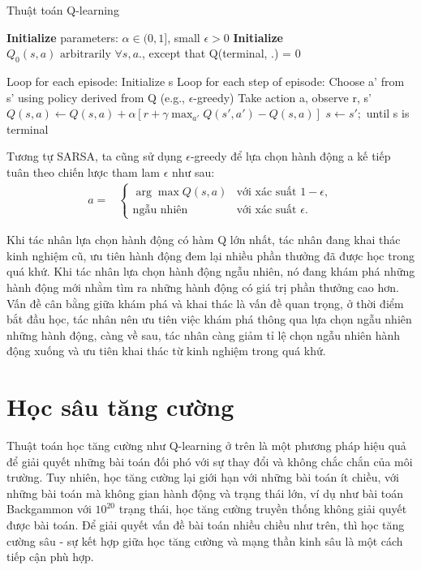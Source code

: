\documentclass{uetgraduation}
\begin{document}
\begin{algorithm}
    \caption{Thuật toán Q-learning}\label{alg:q_learning}
    \begin{algorithmic}[1]
    \State \textbf{Initialize } parameters: $\alpha \in (0, 1]$, small $\epsilon > 0$
    \State \textbf{Initialize } $Q_0(s,a) \text{ arbitrarily } \forall s,a.$, except that Q(terminal, .) = 0
    
    \State Loop for each episode:
        \State \quad Initialize s
        \State \quad Loop for each step of episode:
            \State \quad \quad Choose a' from s' using policy derived from Q (e.g., $\epsilon$-greedy)
            \State \quad \quad Take action a, observe r, s'
            \State \quad \quad $Q(s, a) \leftarrow Q(s, a) + \alpha [r + \gamma \max_{a'} Q (s', a') - Q(s, a)]$
            \State \quad \quad $s \leftarrow s';$
        \State \quad until s is terminal
\end{algorithmic}
\end{algorithm}

Tương tự SARSA, ta cũng sử dụng $\epsilon$-greedy để lựa chọn hành động a kế tiếp tuân theo chiến lược tham lam $\epsilon$ như sau:
\begin{equation}
    \begin{split}
        a =& \begin{cases}
            \arg \max Q(s, a) & \text{với xác suất } 1 - \epsilon, \\ 
            \text{ngẫu nhiên} & \text{với xác suất } \epsilon.
        \end{cases}
    \end{split}
\end{equation}

Khi tác nhân lựa chọn hành động có hàm Q lớn nhất, tác nhân đang khai thác kinh nghiệm cũ, ưu tiên hành động đem lại nhiều phần thưởng đã được học trong quá khứ.
Khi tác nhân lựa chọn hành động ngẫu nhiên, nó đang khám phá những hành động mới nhằm tìm ra những hành động có giá trị phần thưởng cao hơn. Vấn đề cân bằng giữa khám phá và khai thác là
vấn đề quan trọng, ở thời điểm bắt đầu học, tác nhân nên ưu tiên việc khám phá thông qua lựa chọn ngẫu nhiên những hành động, càng về sau, tác nhân càng giảm tỉ lệ chọn ngẫu nhiên hành
động xuống và ưu tiên khai thác từ kinh nghiệm trong quá khứ.

\section{Học sâu tăng cường}
Thuật toán học tăng cường như Q-learning ở trên là một phương pháp hiệu quả để giải quyết những bài toán đối phó với sự thay đổi và không chắc chắn của môi trường. Tuy nhiên, học tăng cường
lại giới hạn với những bài toán ít chiều, với những bài toán mà không gian hành động và trạng thái lớn, ví dụ như bài toán Backgammon với $10^{20}$ trạng thái, học tăng cường truyền thống 
không giải quyết
được bài toán. Để giải quyết vấn đề bài toán nhiều chiều như trên, thì học tăng cường sâu - sự kết hợp giữa học tăng cường và mạng thần kinh sâu là một cách tiếp cận phù hợp.
\end{document}
